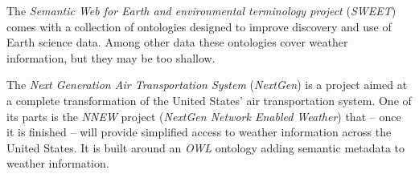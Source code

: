 The \textit{Semantic Web for Earth and environmental terminology project} (\textit{SWEET}) \cite{SWEET} comes with a collection of ontologies designed to improve discovery and use of Earth science data.
Among other data these ontologies cover weather information, but they may be too shallow.

The \textit{Next Generation Air Transportation System} (\textit{NextGen}) \cite{NextGen} is a project aimed at a complete transformation of the United States' air transportation system.
One of its parts is the \textit{NNEW} project (\textit{NextGen Network Enabled Weather}) that -- once it is finished -- will provide simplified access to weather information across the United States.
It is built around an \textit{OWL} ontology adding semantic metadata to weather information.
